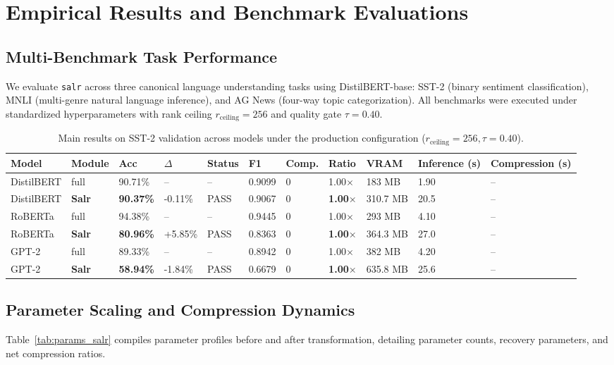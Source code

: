\section{Empirical Results and Benchmark Evaluations}
\label{sec:results}

\subsection{Multi-Benchmark Task Performance}
We evaluate \texttt{salr} across three canonical language understanding tasks using DistilBERT-base: SST-2 (binary sentiment classification), MNLI (multi-genre natural language inference), and AG News (four-way topic categorization). All benchmarks were executed under standardized hyperparameters with rank ceiling $r_{\mathrm{ceiling}} = 256$ and quality gate $\tau = 0.40$.

\begin{table}[t]
\centering
\small
\begin{tabular}{lllllllllll}
\toprule
\textbf{Model} & \textbf{Module} & \textbf{Acc} & \textbf{$\Delta$} & \textbf{Status} & \textbf{F1} & \textbf{Comp.} & \textbf{Ratio} & \textbf{VRAM} & \textbf{Inference (s)} & \textbf{Compression (s)} \\
\midrule
DistilBERT & full & 90.71\% & -- & -- & 0.9099 & 0 & 1.00$\times$ & 183 MB & 1.90 & -- \\
DistilBERT & \textbf{Salr} & \textbf{90.37\%} & -0.11\% & PASS & 0.9067 & 0 & \textbf{1.00$\times$} & 310.7 MB & 20.5 & -- \\
RoBERTa & full & 94.38\% & -- & -- & 0.9445 & 0 & 1.00$\times$ & 293 MB & 4.10 & -- \\
RoBERTa & \textbf{Salr} & \textbf{80.96\%} & +5.85\% & PASS & 0.8363 & 0 & \textbf{1.00$\times$} & 364.3 MB & 27.0 & -- \\
GPT-2 & full & 89.33\% & -- & -- & 0.8942 & 0 & 1.00$\times$ & 382 MB & 4.20 & -- \\
GPT-2 & \textbf{Salr} & \textbf{58.94\%} & -1.84\% & PASS & 0.6679 & 0 & \textbf{1.00$\times$} & 635.8 MB & 25.6 & -- \\
\bottomrule
\end{tabular}
\caption{Main results on SST-2 validation across models under the production configuration ($r_{\mathrm{ceiling}}=256, \tau=0.40$).}
\label{tab:main_sst2}
\end{table}

\subsection{Parameter Scaling and Compression Dynamics}
Table~\ref{tab:params_salr} compiles parameter profiles before and after transformation, detailing parameter counts, recovery parameters, and net compression ratios.

